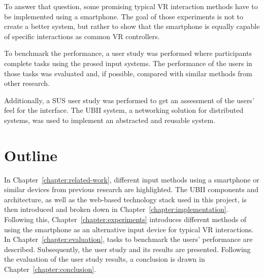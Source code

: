 To answer that question, some promising typical \gls{VR} interaction methods have to be implemented using a smartphone. The goal of those experiments is not to create a better system, but rather to show that the smartphone is equally capable of specific interactions as common \gls{VR} controllers.

To benchmark the performance, a user study was performed where participants complete tasks using the prosed input systems.
The performance of the users in those tasks was evaluated and, if possible, compared with similar methods from other research.

Additionally, a \gls{SUS} user study was performed to get an assessment of the users' feel for the interface.
The \gls{UBII} system, a networking solution for distributed systems, was used to implement an abstracted and reusable system.


\section{Outline}\label{section:outline}
In Chapter~\ref{chapter:related-work}, different input methods using a smartphone or similar devices from previous research are highlighted. The \gls{UBII} components and architecture, as well as the web-based technology stack used in this project, is then introduced and broken down in Chapter~\ref{chapter:implementation}. Following this, Chapter~\ref{chapter:experiments} introduces different methods of using the smartphone as an alternative input device for typical \gls{VR} interactions. In Chapter~\ref{chapter:evaluation}, tasks to benchmark the users' performance are described. Subsequently, the user study and its results are presented. Following the evaluation of the user study results, a conclusion is drawn in Chapter~\ref{chapter:conclusion}.